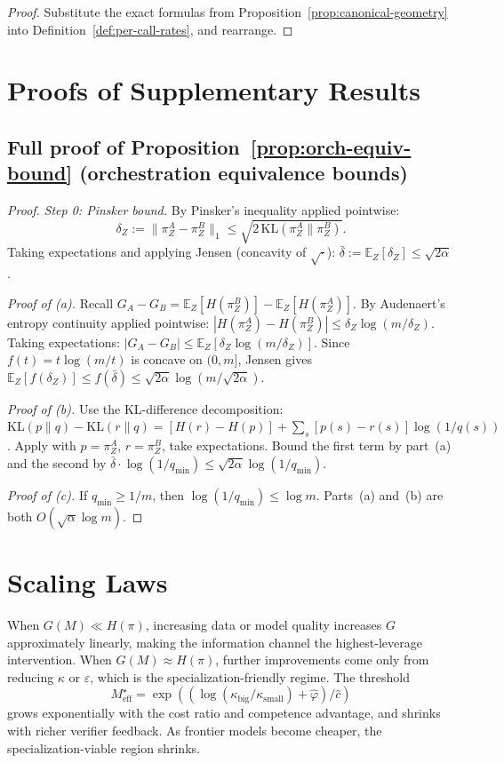 \documentclass[10pt]{article}
\theoremstyle{paperplain}
\theoremstyle{paperdefinition}
\theoremstyle{paperremark}
\newcommand{\KL}{\mathrm{KL}}
\newcommand{\E}{\mathbb{E}}
\newcommand{\Meff}{M_{\mathrm{eff}}}
\begin{document}
\begin{proof}
Substitute the exact formulas from Proposition~\ref{prop:canonical-geometry} into Definition~\ref{def:per-call-rates}, and rearrange.
\end{proof}

\section{Proofs of Supplementary Results}
\label{app:proofs}

\subsection{Full proof of Proposition~\ref{prop:orch-equiv-bound} (orchestration equivalence bounds)}

\begin{proof}
\emph{Step 0: Pinsker bound.}
By Pinsker's inequality applied pointwise:
\[
\delta_Z := \|\pi^A_Z - \pi^B_Z\|_1 \le \sqrt{2\,\KL(\pi^A_Z \| \pi^B_Z)}.
\]
Taking expectations and applying Jensen (concavity of $\sqrt{\cdot}$):
$\bar\delta := \E_Z[\delta_Z] \le \sqrt{2\alpha}$.

\emph{Proof of (a).}
Recall $G_A - G_B = \E_Z[H(\pi^B_Z)] - \E_Z[H(\pi^A_Z)]$.
By Audenaert's entropy continuity applied pointwise:
$|H(\pi^A_Z) - H(\pi^B_Z)| \le \delta_Z \log(m/\delta_Z)$.
Taking expectations:
$|G_A - G_B| \le \E_Z[\delta_Z \log(m/\delta_Z)]$.
Since $f(t) = t\log(m/t)$ is concave on $(0, m]$,
Jensen gives $\E_Z[f(\delta_Z)] \le f(\bar\delta) \le \sqrt{2\alpha}\log(m/\sqrt{2\alpha})$.

\emph{Proof of (b).}
Use the KL-difference decomposition:
$\KL(p\|q) - \KL(r\|q) = [H(r) - H(p)] + \sum_s [p(s) - r(s)]\log(1/q(s))$.
Apply with $p = \pi^A_Z$, $r = \pi^B_Z$, take expectations.
Bound the first term by part~(a) and the second by $\bar\delta \cdot \log(1/q_{\min}) \le \sqrt{2\alpha}\log(1/q_{\min})$.

\emph{Proof of (c).}
If $q_{\min} \ge 1/m$, then $\log(1/q_{\min}) \le \log m$.
Parts~(a) and~(b) are both $O(\sqrt{\alpha}\log m)$.
\end{proof}

\section{Scaling Laws}
\label{app:scaling}

When $G(M)\ll H(\pi)$, increasing data or model quality increases $G$ approximately linearly, making the information channel the highest-leverage intervention. When $G(M)\approx H(\pi)$, further improvements come only from reducing $\kappa$ or $\varepsilon$, which is the specialization-friendly regime. The threshold
\[
\Meff^\star=\exp((\log(\kappa_{\mathrm{big}}/\kappa_{\mathrm{small}})+\hat\varphi)/\hat c)
\]
grows exponentially with the cost ratio and competence advantage, and shrinks with richer verifier feedback. As frontier models become cheaper, the specialization-viable region shrinks.
\end{document}
